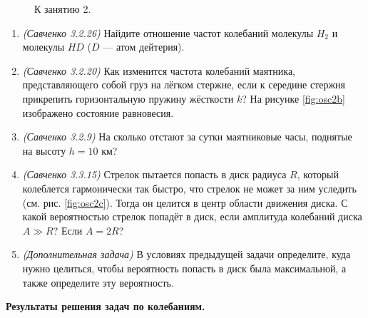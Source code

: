\documentclass[12pt]{article}
\newlength{\h}
\newlength{\x}
\begin{document}
\begin{enumerate}
\begin{figure}[ht]
{
      \label{fig:osc2c}
    }
    \caption{К занятию 2.}
    \label{fig:osc2}
  \end{figure}
  \begin{enumerate}
  \item \textit{(Савченко 3.2.26)} Найдите отношение частот колебаний
    молекулы $H_2$ и молекулы $HD$ ($D$ --- атом дейтерия).
  \item \textit{(Савченко 3.2.20)} Как изменится частота колебаний
    маятника, представляющего собой груз на лёгком стержне, если к
    середине стержня прикрепить горизонтальную пружину жёсткости $k$?
    На рисунке \ref{fig:osc2b} изображено состояние равновесия.
  \item \textit{(Савченко 3.2.9)} На сколько отстают за сутки
    маятниковые часы, поднятые на высоту $h=10$ км?
  \item \textit{(Савченко 3.3.15)} Стрелок пытается попасть в диск
    радиуса $R$, который колеблется гармонически так быстро, что
    стрелок не может за ним уследить (см. рис. \ref{fig:osc2c}). Тогда
    он целится в центр области движения диска. С какой вероятностью
    стрелок попадёт в диск, если амплитуда колебаний диска $A \gg R$?
    Если $A=2R$?
  \item \textit{(Дополнительная задача)} В условиях предыдущей задачи
    определите, куда нужно целиться, чтобы вероятность попасть в диск
    была максимальной, а также определите эту вероятность.
  \end{enumerate}
\end{enumerate}


\begin{center}
  \textbf{Результаты решения задач по колебаниям. }
\end{center}
\end{document}
